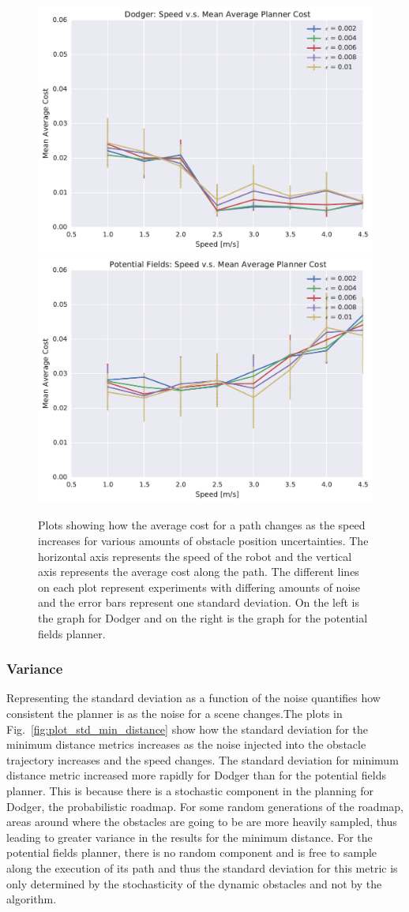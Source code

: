 \documentclass[letterpaper, 10pt, conference]{ieeeconf}
\begin{document}
\begin{figure}[h!]
    \centering
    \includegraphics[width=0.48\linewidth]{figs/planner_mean_avg_cost_0}
    \includegraphics[width=0.48\linewidth]{figs/pf_mean_avg_cost_0}

    \caption{Plots showing how the average cost for a path changes as the
        speed increases for various amounts of obstacle position uncertainties.
        The horizontal axis represents the speed of the robot and the vertical
        axis represents the average cost along the path. The different lines on
    each plot represent experiments with differing amounts of noise and the
error bars represent one standard deviation.  On the left is the graph for
Dodger and on the right is the graph for the potential fields planner.}

    \label{fig:plot_avg_cost}
\end{figure}

\subsubsection{Variance}

Representing the standard deviation as a function of the noise quantifies how
consistent the planner is as the noise for a scene changes.The plots in
Fig.~\ref{fig:plot_std_min_distance} show how the standard deviation for the
minimum distance metrics increases as the noise injected into the obstacle
trajectory increases and the speed changes. The standard deviation for minimum
distance metric increased more rapidly for Dodger than for the potential fields
planner.  This is because there is a stochastic component in the planning for
Dodger, the probabilistic roadmap. For some random generations of the roadmap,
areas around where the obstacles are going to be are more heavily sampled, thus
leading to greater variance in the results for the minimum distance. For the
potential fields planner, there is no random component and is free to sample
along the execution of its path and thus the standard deviation for this metric
is only determined by the stochasticity of the dynamic obstacles and not by the
algorithm.
\end{document}

